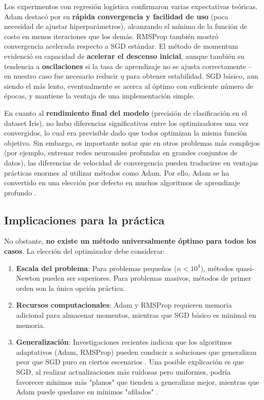 \documentclass[12pt, spanish]{article}
\begin{document}
Los experimentos con regresión logística confirmaron varias expectativas teóricas. Adam destacó por su \textbf{rápida convergencia y facilidad de uso} (poca necesidad de ajustar hiperparámetros), alcanzando el mínimo de la función de costo en menos iteraciones que los demás. RMSProp también mostró convergencia acelerada respecto a SGD estándar. El método de momentum evidenció su capacidad de \textbf{acelerar el descenso inicial}, aunque también su tendencia a \textbf{oscilaciones} si la tasa de aprendizaje no se ajusta correctamente – en nuestro caso fue necesario reducir $\eta$ para obtener estabilidad. SGD básico, aun siendo el más lento, eventualmente se acerca al óptimo con suficiente número de épocas, y mantiene la ventaja de una implementación simple.

En cuanto al \textbf{rendimiento final del modelo} (precisión de clasificación en el dataset Iris), no hubo diferencias significativas entre los optimizadores una vez convergidos, lo cual era previsible dado que todos optimizan la misma función objetivo. Sin embargo, es importante notar que en otros problemas más complejos (por ejemplo, entrenar redes neuronales profundas en grandes conjuntos de datos), las diferencias de velocidad de convergencia pueden traducirse en ventajas prácticas enormes al utilizar métodos como Adam. Por ello, Adam se ha convertido en una elección por defecto en muchos algoritmos de aprendizaje profundo \cite{ref2}.

\subsection{Implicaciones para la práctica}
No obstante, \textbf{no existe un método universalmente óptimo para todos los casos}. La elección del optimizador debe considerar:

\begin{enumerate}
\item \textbf{Escala del problema}: Para problemas pequeños ($n < 10^4$), métodos quasi-Newton pueden ser superiores. Para problemas masivos, métodos de primer orden son la única opción práctica.
\item \textbf{Recursos computacionales}: Adam y RMSProp requieren memoria adicional para almacenar momentos, mientras que SGD básico es minimal en memoria.
\item \textbf{Generalización}: Investigaciones recientes indican que los algoritmos adaptativos (Adam, RMSProp) pueden conducir a soluciones que generalizan peor que SGD puro en ciertos escenarios \cite{ref5}. Una posible explicación es que SGD, al realizar actualizaciones más ruidosas pero uniformes, podría favorecer mínimos más "planos" que tienden a generalizar mejor, mientras que Adam puede quedarse en mínimos "afilados" \cite{ref5}.
\end{enumerate}
\end{document}
